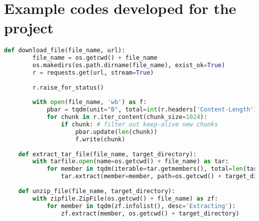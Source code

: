 \appendix

\section{Example codes developed for the project}

\begin{lstlisting}[language=Python, caption=Helper functions used to download and extract files]
    def download_file(file_name, url):
        file_name = os.getcwd() + file_name
        os.makedirs(os.path.dirname(file_name), exist_ok=True)
        r = requests.get(url, stream=True)
    
        r.raise_for_status()
    
        with open(file_name, 'wb') as f:
            pbar = tqdm(unit="B", total=int(r.headers['Content-Length']), position=0, leave=True, desc='Downloading')
            for chunk in r.iter_content(chunk_size=1024): 
                if chunk: # filter out keep-alive new chunks
                    pbar.update(len(chunk))
                    f.write(chunk)
    
    def extract_tar_file(file_name, target_directory):
        with tarfile.open(name=os.getcwd() + file_name) as tar:
            for member in tqdm(iterable=tar.getmembers(), total=len(tar.getmembers()), desc='Extracting'):
                tar.extract(member=member, path=os.getcwd() + target_directory) 
    
    def unzip_file(file_name, target_directory):
        with zipfile.ZipFile(os.getcwd() + file_name) as zf:
            for member in tqdm(zf.infolist(), desc='Extracting'):
                zf.extract(member, os.getcwd() + target_directory)
\end{lstlisting}